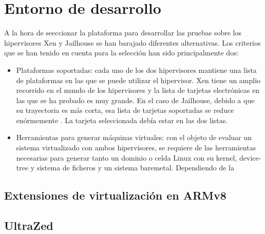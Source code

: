 \chapter{Entorno de desarrollo}

A la hora de seeccionar la plataforma para desarrollar las pruebas sobre los hipervisores Xen y Jailhouse se han barajado diferentes alternativas. Los criterios que se han tenido en cuenta para la selección han sido principalmente dos:
\begin{itemize}
  \item Plataformas soportadas: cada uno de los dos hipervisores mantiene una lista de plataformas en las que se puede utilizar el hipervisor. Xen tiene un amplio recorrido en el mundo de los hipervisores y la lista de tarjetas electrónicas en las que se ha probado es muy grande. En el caso de Jailhouse, debido a que su trayectoria es más corta, esa lista de tarjetas soportadas se reduce enórmemente \cite{jailhouse_github}. La tarjeta seleccionada debía estar en las dos listas.
  \item Herramientas para generar máquinas virtuales: con el objeto de evaluar un sistema virtualizado con ambos hipervisores, se requiere de las herramientas necesarias para generar tanto un dominio o celda Linux con su kernel, device-tree y sistema de ficheros y un sistema baremetal. Dependiendo de la 
\end{itemize}

\section{Extensiones de virtualización en ARMv8}

\section{UltraZed}
